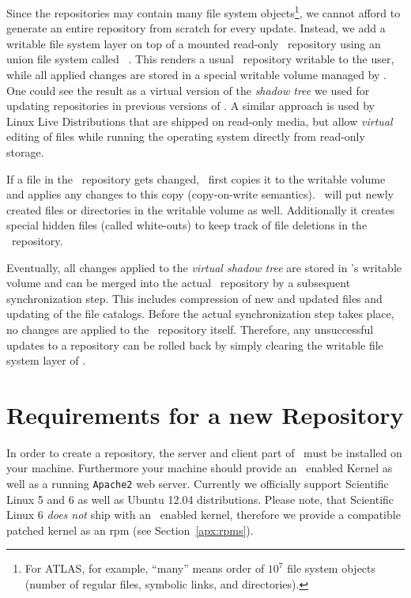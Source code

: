 Since the repositories may contain many file system objects\footnote{For ATLAS, for example, ``many'' means order of $10^7$ file system objects (\ie number of regular files, symbolic links, and directories).}, we cannot afford to generate an entire repository from scratch for every update.
Instead, we add a writable file system layer on top of a mounted read-only \cvmfs\ repository using an union file system called \aufs~\cite{aufs}.
This renders a usual \cvmfs\ repository writable to the user, while all applied changes are stored in a special writable volume managed by \aufs.
One could see the result as a virtual version of the \emph{shadow tree} we used for updating repositories in previous versions of \cvmfs.
A similar approach is used by Linux Live Distributions that are shipped on read-only media, but allow \emph{virtual} editing of files while running the operating system directly from read-only storage.

If a file in the \cvmfs\ repository gets changed, \aufs\ first copies it to the writable volume and applies any changes to this copy (copy-on-write semantics).
\aufs\ will put newly created files or directories in the writable volume as well.
Additionally it creates special hidden files (called white-outs) to keep track of file deletions in the \cvmfs\ repository.

Eventually, all changes applied to the \emph{virtual shadow tree} are stored in \aufs's writable volume and can be merged into the actual \cvmfs\ repository by a subsequent synchronization step.
This includes compression of new and updated files and updating of the file catalogs.
Before the actual synchronization step takes place, no changes are applied to the \cvmfs\ repository itself.
Therefore, any unsuccessful updates to a repository can be rolled back by simply clearing the writable file system layer of \aufs.

\section{Requirements for a new Repository}
\label{sct:newreporequirements}

In order to create a repository, the server and client part of \cvmfs\ must be installed on your machine.
Furthermore your machine should provide an \aufs\ enabled Kernel as well as a running \texttt{Apache2} web server.
Currently we officially support Scientific Linux 5 and 6 as well as Ubuntu 12.04 distributions.
Please note, that Scientific Linux 6 \emph{does not} ship with an \aufs\ enabled kernel, therefore we provide a compatible patched kernel as an rpm (see Section~\ref{apx:rpms}).

